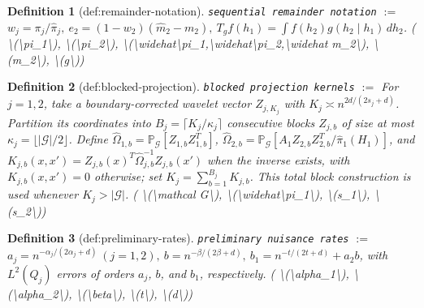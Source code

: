\documentclass{article}
\newtheorem{definition}{Definition}
\begin{document}
\begin{definition}[def:remainder-notation]\label{def:remainder-notation}
\texttt{sequential remainder notation} $:=$ \(w_j=\pi_j/\widehat\pi_j,\ e_2=(1-w_2)(\widehat m_2-m_2),\ T_gf(h_1)=\int f(h_2)g(h_2\mid h_1)\,dh_2\). \quad ( \textbackslash{}(\textbackslash{}pi\_1\textbackslash{}), \textbackslash{}(\textbackslash{}pi\_2\textbackslash{}), \textbackslash{}(\textbackslash{}widehat\textbackslash{}pi\_1,\textbackslash{}widehat\textbackslash{}pi\_2,\textbackslash{}widehat m\_2\textbackslash{}), \textbackslash{}(m\_2\textbackslash{}), \textbackslash{}(g\textbackslash{}))
\end{definition}

\begin{definition}[def:blocked-projection]\label{def:blocked-projection}
\texttt{blocked projection kernels} $:=$ For \(j=1,2\), take a boundary-corrected wavelet vector \(Z_{j,K_j}\) with \(K_j\asymp n^{2d/(2s_j+d)}\). Partition its coordinates into \(B_j=\lceil K_j/\kappa_j\rceil\) consecutive blocks \(Z_{j,b}\) of size at most \(\kappa_j=\lfloor|\mathcal G|/2\rfloor\). Define \(\widehat\Omega_{1,b}=\mathbb P_{\mathcal G}[Z_{1,b}Z_{1,b}^{T}]\), \(\widehat\Omega_{2,b}=\mathbb P_{\mathcal G}[A_1Z_{2,b}Z_{2,b}^{T}/\widehat\pi_1(H_1)]\), and \(K_{j,b}(x,x')=Z_{j,b}(x)^T\widehat\Omega_{j,b}^{-1}Z_{j,b}(x')\) when the inverse exists, with \(K_{j,b}(x,x')=0\) otherwise; set \(K_j=\sum_{b=1}^{B_j}K_{j,b}\). This total block construction is used whenever \(K_j>|\mathcal G|\). \quad ( \textbackslash{}(\textbackslash{}mathcal G\textbackslash{}), \textbackslash{}(\textbackslash{}widehat\textbackslash{}pi\_1\textbackslash{}), \textbackslash{}(s\_1\textbackslash{}), \textbackslash{}(s\_2\textbackslash{}))
\end{definition}

\begin{definition}[def:preliminary-rates]\label{def:preliminary-rates}
\texttt{preliminary nuisance rates} $:=$ \(a_j=n^{-\alpha_j/(2\alpha_j+d)}\ (j=1,2),\ b=n^{-\beta/(2\beta+d)},\ b_1=n^{-t/(2t+d)}+a_2b\), with \(L^2(Q_j)\) errors of orders \(a_j\), \(b\), and \(b_1\), respectively. \quad ( \textbackslash{}(\textbackslash{}alpha\_1\textbackslash{}), \textbackslash{}(\textbackslash{}alpha\_2\textbackslash{}), \textbackslash{}(\textbackslash{}beta\textbackslash{}), \textbackslash{}(t\textbackslash{}), \textbackslash{}(d\textbackslash{}))
\end{definition}
\end{document}
